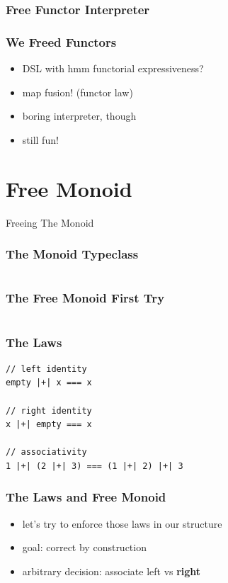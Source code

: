 \documentclass{beamer}
\begin{document}
\begin{frame}[fragile]
  \frametitle{Free Functor Interpreter}
\end{frame}

\begin{frame}
  \frametitle{We Freed Functors}
  \begin{itemize}
  \item<1-> DSL with hmm functorial expressiveness?
  \item<1-> map fusion! (functor law)
  \item<1-> boring interpreter, though
  \item<2-> still fun!
  \end{itemize}
\end{frame}

\section{Free Monoid}
\label{sec:free-monoid}

\begin{frame}
  \begin{center}
    \Huge
    Freeing The Monoid
  \end{center}
\end{frame}

\begin{frame}
  \frametitle{The Monoid Typeclass}
  \inputminted{scala}{snippets/monoid-typeclass.scala}
\end{frame}

\begin{frame}
  \frametitle{The Free Monoid \textemdash{} First Try}
  \inputminted{scala}{snippets/free-monoid-1.scala}
\end{frame}

\begin{frame}[fragile]
  \frametitle{The Laws}
  \begin{verbatim}
// left identity
empty |+| x === x

// right identity
x |+| empty === x

// associativity
1 |+| (2 |+| 3) === (1 |+| 2) |+| 3
  \end{verbatim}
\end{frame}

\begin{frame}
  \frametitle{The Laws and Free Monoid}
  \begin{itemize}
  \item let's try to enforce those laws in our structure
  \item goal: correct by construction
  \item arbitrary decision: associate left vs \textbf{right}
  \end{itemize}
\end{frame}
\end{document}

